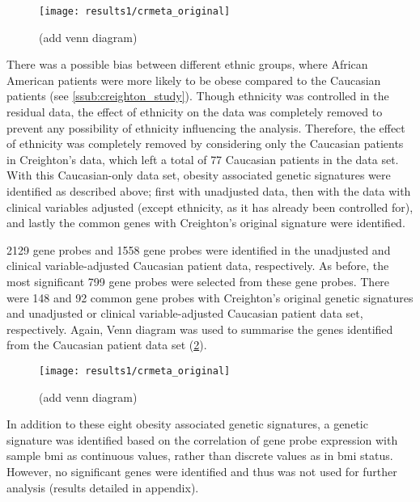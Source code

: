 \begin{figure}[htp!]
	\centering
	\texttt{[image: results1/crmeta\_original]}
	\caption[Summary of the \glspl{deg} identified from Creighton's data]{(add venn diagram)}
	\label{fig:venn1}
\end{figure}

\noindent
There was a possible bias between different ethnic groups, where African American patients were more likely to be obese compared to the Caucasian patients (see \cref{ssub:creighton_study}).
Though ethnicity was controlled in the residual data, the effect of ethnicity on the data was completely removed to prevent any possibility of ethnicity influencing the analysis.
Therefore, the effect of ethnicity was completely removed by considering only the Caucasian patients in Creighton's data, which left a total of 77 Caucasian patients in the data set.
With this Caucasian-only data set, obesity associated genetic signatures were identified as described above; first with unadjusted data, then with the data with clinical variables adjusted (except ethnicity, as it has already been controlled for), and lastly the common genes with Creighton's original signature were identified.

2129 gene probes and 1558 gene probes were identified in the unadjusted and clinical variable-adjusted Caucasian patient data, respectively.
As before, the most significant 799 gene probes were selected from these gene probes.
There were 148 and 92 common gene probes with Creighton's original genetic signatures and unadjusted or clinical variable-adjusted Caucasian patient data set, respectively.
Again, Venn diagram was used to summarise the genes identified from the Caucasian patient data set (\cref{fig:venn2}).
\\

\begin{figure}[htp!]
	\centering
	\texttt{[image: results1/crmeta\_original]}
	\caption[Summary of the \glspl{deg} identified from Creighton's data (Caucasian patient data)]{(add venn diagram)}
	\label{fig:venn2}
\end{figure}

\noindent
In addition to these eight obesity associated genetic signatures, a genetic signature was identified based on the correlation of gene probe expression with sample \gls{bmi} as continuous values, rather than discrete values as in \gls{bmi} status.
However, no significant genes were identified and thus was not used for further analysis (results detailed in appendix).

